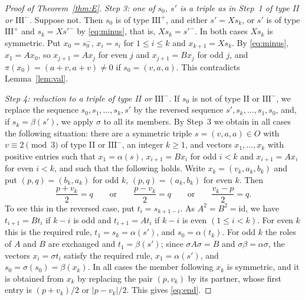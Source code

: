 \documentclass[11pt]{amsart}
\theoremstyle{definition}
\theoremstyle{remark}
\begin{document}
\begin{proof}[Proof of Theorem~\ref{thm:E}]
\emph{Step 3: one of $s_0$, $s'$ is a triple as in Step~1 of type \textup{II} or $\mathrm{III}^-$.}
Suppose not. Then $s_0$ is of type $\mathrm{III}^+$, and either $s'=Xs_k$, or $s'$ is of type $\mathrm{III}^+$ and $s_k=Xs'^-$ by \eqref{eq:minus}, that is, $Xs_k=s'^-$.
In both cases $Xs_k$ is symmetric. Put $x_0=s_0^-$, $x_i=s_i$ for $1\le i\le k$ and $x_{k+1}=Xs_k$. By \eqref{eq:minus}, $x_1=Ax_0$, so $x_{j+1}=Ax_j$ for even $j$ and $x_{j+1}=Bx_j$ for odd $j$,
and $\pi(x_0)=(a+v,a+v)\ne 0$ if $s_0=(v,a,a)$. This contradicts Lemma~\ref{lem:val}.

\emph{Step 4: reduction to a triple of type \textup{II} or $\mathrm{III}^-$.}
If $s_0$ is not of type II or $\mathrm{III}^-$, we replace the sequence $s_0,s_1,\dots,s_k,s'$ by the reversed sequence $s',s_k,\dots,s_1,s_0$,
and, if $s_k=\beta(s')$, we apply $\sigma$ to all its members. By Step~3 we obtain in all cases the following situation:
there are a symmetric triple $s=(v,a,a)\in O$ with $v\equiv 2\pmod 3$ of type II or $\mathrm{III}^-$, an integer $k\ge 1$, and vectors $x_1,\dots,x_k$ with positive entries such that
$x_1=\alpha(s)$, $x_{i+1}=Bx_i$ for odd $i<k$ and $x_{i+1}=Ax_i$ for even $i<k$, and such that the following holds.
Write $x_k=(v_k,a_k,b_k)$ and put $(p,q)=(b_k,a_k)$ for odd $k$, $(p,q)=(a_k,b_k)$ for even $k$. Then
\begin{equation}\label{eq:end}
\frac{p+v_k}{2}=q\qquad\text{or}\qquad \frac{p-v_k}{2}=q\qquad\text{or}\qquad \frac{v_k-p}{2}=q .
\end{equation}
To see this in the reversed case, put $t_i=s_{k+1-i}$. As $A^2=B^2=\mathrm{id}$, we have $t_{i+1}=Bt_i$ if $k-i$ is odd and $t_{i+1}=At_i$ if $k-i$ is even $(1\le i<k)$.
For even $k$ this is the required rule, $t_1=s_k=\alpha(s')$, and $s_0=\alpha(t_k)$. For odd $k$ the roles of $A$ and $B$ are exchanged and $t_1=\beta(s')$;
since $\sigma A\sigma=B$ and $\sigma\beta=\alpha\sigma$, the vectors $x_i=\sigma t_i$ satisfy the required rule, $x_1=\alpha(s')$, and $s_0=\sigma(s_0)=\beta(x_k)$.
In all cases the member following $x_k$ is symmetric, and it is obtained from $x_k$ by replacing the pair $(p,v_k)$ by its partner, whose first entry is $(p+v_k)/2$ or $|p-v_k|/2$. This gives \eqref{eq:end}.


\end{proof}
\end{document}
